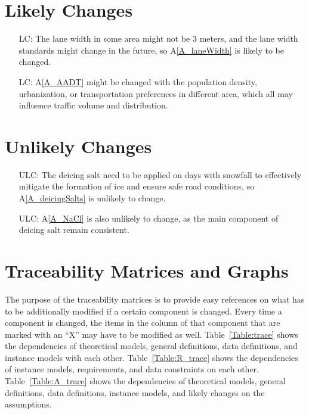 \documentclass[12pt]{article}
\newcommand{\aref}[1]{A\ref{#1}}
\newcounter{lcnum} %
\newcounter{ulcnum} %
\begin{document}
\section{Likely Changes}    

\noindent \begin{itemize}

\item[LC\refstepcounter{lcnum}\thelcnum\label{LC_laneWidth}:] The lane width in some area might not be 3 meters, and the lane width standards might change in the future, so \aref{A_laneWidth} is likely to be changed. 
\item[LC\refstepcounter{lcnum}\thelcnum\label{LC_AADT}:] \aref{A_AADT} might be changed with the population density, urbanization, or transportation preferences in different area, which all may influence traffic volume and distribution.

\end{itemize}

\section{Unlikely Changes}    

\noindent \begin{itemize}
\item[ULC\refstepcounter{ulcnum}\theulcnum\label{ULC_saltSame}:] The deicing salt need to be applied on days with snowfall to effectively mitigate the formation of ice and ensure safe road conditions, so \aref{A_deicingSalts} is unlikely to change.

\item[ULC\refstepcounter{ulcnum}\theulcnum\label{ULC_NaCl}:] \aref{A_NaCl} is also unlikely to change, as the main component of deicing salt remain consistent.


\end{itemize}

\section{Traceability Matrices and Graphs}

The purpose of the traceability matrices is to provide easy references on what
has to be additionally modified if a certain component is changed.  Every time a
component is changed, the items in the column of that component that are marked
with an ``X'' may have to be modified as well.  Table~\ref{Table:trace} shows the
dependencies of theoretical models, general definitions, data definitions, and
instance models with each other. Table~\ref{Table:R_trace} shows the
dependencies of instance models, requirements, and data constraints on each
other. Table~\ref{Table:A_trace} shows the dependencies of theoretical models,
general definitions, data definitions, instance models, and likely changes on
the assumptions.
\end{document}
